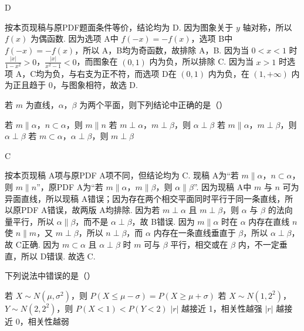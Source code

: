 \documentclass[UTF8,a4paper,oneside,11pt]{ctexbook}
\begin{document}
\begin{answer}
D
\end{answer}

\begin{solution}
按本页现稿与原PDF题面条件等价，结论均为 D. 因为图象关于 \(y\) 轴对称，所以 \(f\left( x \right)\) 为偶函数. 因为选项 A中 \(f\left( -x \right)=-f\left( x \right)\)，选项 B中 \(f\left( -x \right)=-f\left( x \right)\)，所以 A，B均为奇函数，故排除 A，B. 因为当 \(0<x<1\) 时 \(\frac{\left| x \right|}{1-x^{2}}>0\)，\(\frac{\left| x \right|}{x^{2}-1}<0\)，而图象在 \(\left( 0,1 \right)\) 内为负，所以排除 C. 因为当 \(x>1\) 时选项 A，C均为负，与右支为正不符，而选项 D在 \(\left( 0,1 \right)\) 内为负，在 \(\left( 1,+\infty \right)\) 内为正且趋于 \(0\)，与图象相符，故选 D.
\end{solution}

\begin{problem}
若 \(m\) 为直线，\(\alpha\)，\(\beta\) 为两个平面，则下列结论中正确的是（\quad）

\choices
    {若 \(m\parallel \alpha\)，\(n\subset \alpha\)，则 \(m\parallel n\)}
    {若 \(m\perp\alpha\)，\(m\perp\beta\)，则 \(\alpha\perp\beta\)}
    {若 \(m\parallel\alpha\)，\(m\perp\beta\)，则 \(\alpha\perp\beta\)}
    {若 \(m\subset\alpha\)，\(\alpha\perp\beta\)，则 \(m\perp\beta\)}
\end{problem}

\begin{answer}
C
\end{answer}

\begin{solution}
按本页现稿 A项与原PDF A项不同，但结论均为 C. 现稿 A为“若 \(m\parallel \alpha\)，\(n\subset \alpha\)，则 \(m\parallel n\)”，原PDF A为“若 \(m\parallel \alpha\)，\(m\parallel \beta\)，则 \(\alpha\parallel \beta\)”. 因为现稿 A中 \(m\) 与 \(n\) 可为异面直线，所以现稿 A错误；因为存在两个相交平面同时平行于同一条直线，所以原PDF A错误，故两版 A均排除. 因为若 \(m\perp \alpha\) 且 \(m\perp \beta\)，则 \(\alpha\) 与 \(\beta\) 的法向量平行，所以 \(\alpha\parallel \beta\)，而不是 \(\alpha\perp \beta\)，故 B错误. 因为 \(m\parallel \alpha\) 时在 \(\alpha\) 内存在直线 \(n\) 使 \(n\parallel m\)，又 \(m\perp \beta\)，所以 \(n\perp \beta\)，而 \(\alpha\) 内存在一条直线垂直于 \(\beta\)，所以 \(\alpha\perp \beta\)，故 C正确. 因为 \(m\subset \alpha\) 且 \(\alpha\perp \beta\) 时 \(m\) 可与 \(\beta\) 平行，相交或在 \(\beta\) 内，不一定垂直，所以 D错误. 故选 C.
\end{solution}

\begin{problem}
下列说法中错误的是（\quad）

\choices
    {若 \(X\sim N(\mu,\sigma^2)\)，则 \(P(X\le\mu-\sigma)=P(X\ge\mu+\sigma)\)}
    {若 \(X\sim N(1,2^2)\)，\(Y\sim N(2,2^2)\)，则 \(P(X<1)<P(Y<2)\)}
    {\(|r|\) 越接近 1，相关性越强}
    {\(|r|\) 越接近 0，相关性越弱}
\end{problem}
\end{document}
